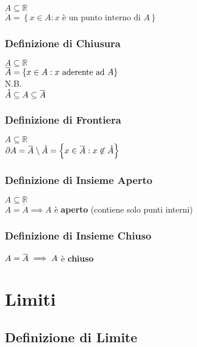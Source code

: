\documentclass[a4paper, twoside, italian, 11pt]{book}
\newcommand{\braces}[1] {\left \{ #1 \right \}}
\newcommand{\overbar}[1] {\mkern 1.5mu\overline{\mkern-1.5mu#1\mkern-1.5mu}\mkern 1.5mu}
\newcommand{\R}{\mathbb{R}}
\begin{document}
\noindent
$A \subseteq \R$ \\

$\mathring A = \braces{x \in A : x \text{ è un punto interno di } A}$


\subsection{Definizione di Chiusura}

\noindent
$A \subseteq \R$ \\

$\overbar A = \braces{x \in A : x \text{ aderente ad } A}$ \\

\noindent
N.B. \\
$\mathring A \subseteq A \subseteq \overbar A$


\subsection{Definizione di Frontiera}

\noindent
$A \subseteq \R$ \\

$\partial A = \overbar A \setminus \mathring A = \braces{x \in \overbar A : x \not\in \mathring A}$


\subsection{Definizione di Insieme Aperto}

\noindent
$A \subseteq \R$ \\

$A = \mathring{A} \implies A$ è \textbf{aperto} (contiene solo punti interni)


\subsection{Definizione di Insieme Chiuso}

$A = \overbar A \implies A$ è \textbf{chiuso}



\chapter{Limiti}



\section{Definizione di Limite}
\end{document}
